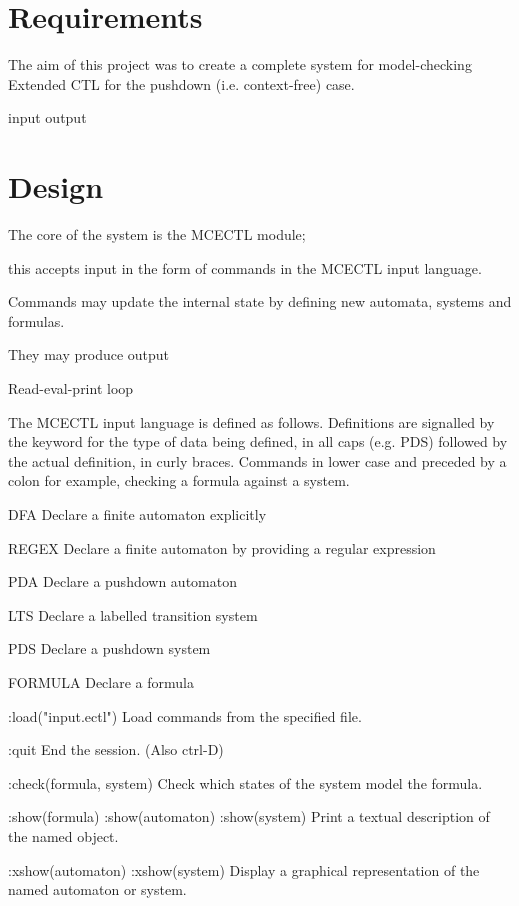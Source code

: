 \documentclass[11pt]{article}
\begin{document}
\section{Requirements}

The aim of this project was to create a complete system for model-checking Extended CTL for the pushdown (i.e. context-free) case. 

input
output



\section{Design}

The core of the system is the MCECTL module; 

this accepts input in the form of commands in the MCECTL input language. 

Commands may update the internal state by defining new automata, systems and formulas.

They may produce output


Read-eval-print loop


The MCECTL input language is defined as follows.
Definitions are signalled by the keyword for the type of data being defined, in all caps (e.g. PDS) followed by the actual definition, in curly braces.
Commands in lower case and preceded by a colon 
for example, checking a formula against a system.

DFA
Declare a finite automaton explicitly

REGEX
Declare a finite automaton by providing a regular expression

PDA
Declare a pushdown automaton

LTS
Declare a labelled transition system

PDS
Declare a pushdown system 

FORMULA
Declare a formula

:load("input.ectl")
Load commands from the specified file.

:quit
End the session. (Also ctrl-D)

:check(formula, system)
Check which states of the system model the formula.

:show(formula)
:show(automaton)
:show(system)
Print a textual description of the named object.

:xshow(automaton)
:xshow(system)
Display a graphical representation of the named automaton or system.
\end{document}
